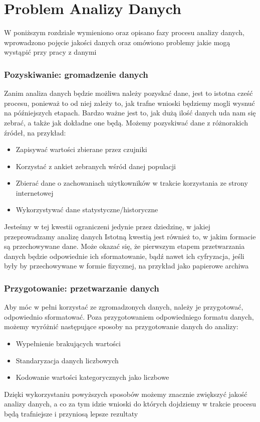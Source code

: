 \documentclass{book}
\begin{document}
\chapter{Problem Analizy Danych}



W poniższym rozdziale wymieniono oraz opisano fazy procesu analizy danych, wprowadzono
pojęcie jakości danych oraz omówiono problemy jakie mogą wystąpić przy pracy z danymi

\subsection*{Pozyskiwanie: gromadzenie danych}
Zanim analiza danych będzie możliwa należy pozyskać dane, 
jest to istotna cześć procesu, ponieważ to od niej zależy to, 
jak trafne wnioski będziemy mogli wysnuć na późniejszych etapach.
Bardzo ważne jest to, jak dużą ilość danych uda nam się zebrać, a także jak dokładne one będą.
Możemy pozyskiwać dane z różnorakich źródeł, na przykład: 
\begin{itemize}
    \item Zapisywać wartości zbierane przez czujniki \cite{data_from_sensors}
    \item Korzystać z ankiet zebranych wśród danej populacji \cite{data_from_questionaire}
    \item Zbierać dane o zachowaniach użytkowników w trakcie korzystania ze strony internetowej \cite{data_from_behavior}
    \item Wykorzystywać dane statystyczne/historyczne \cite{data_from_statistics}
  \end{itemize}
Jesteśmy w tej kwestii ograniczeni jedynie przez dziedzinę, w jakiej przeprowadzamy analizę danych
Istotną kwestią jest również to, w jakim formacie są 
przechowywane dane. Może okazać się, że pierwszym etapem przetwarzania danych 
będzie odpowiednie ich sformatowanie, bądź nawet ich cyfryzacja, jeśli były 
by przechowywane w formie fizycznej, na przykład jako papierowe archiwa


\subsection*{Przygotowanie: przetwarzanie danych}
Aby móc w pełni korzystać ze zgromadzonych danych, 
należy je przygotować, odpowiednio sformatować. 
Poza przygotowaniem odpowiedniego formatu danych, 
możemy wyróżnić następujące sposoby na przygotowanie danych do analizy:
\begin{itemize}
    \item Wypełnienie brakujących wartości 
    \item Standaryzacja danych liczbowych
    \item Kodowanie wartości kategorycznych jako liczbowe
  \end{itemize}
Dzięki wykorzystaniu powyższych sposobów możemy znacznie zwiększyć jakość analizy danych, 
a co za tym idzie wnioski do których dojdziemy w trakcie procesu będą 
trafniejsze i przyniosą lepsze rezultaty
\end{document}
